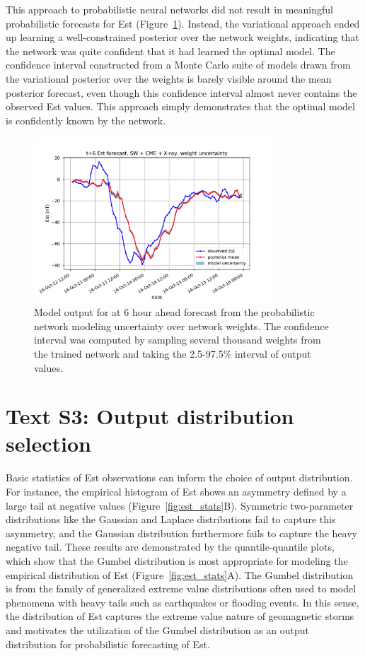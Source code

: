 \documentclass{agujournal2018}
\begin{document}
This approach to probabilistic neural networks did not result in meaningful probabilistic forecasts for Est (Figure~\ref{fig:weight_uncertainty}). Instead, the variational approach ended up learning a well-constrained posterior over the network weights, indicating that the network was quite confident that it had learned the optimal model. The confidence interval constructed from a Monte Carlo suite of models drawn from the variational posterior over the weights is barely visible around the mean posterior forecast, even though this confidence interval almost never contains the observed Est values. This approach simply demonstrates that the optimal model is confidently known by the network.

\begin{figure}[htbp]
  \centering
  \includegraphics[width=0.8\textwidth]{figures/supplement/Est_forecast_SWCMEXray_weightuncertainty_t+6_storm1.pdf} 
  \caption{Model output for at 6 hour ahead forecast from the probabilistic network modeling uncertainty over network weights. The confidence interval was computed by sampling several thousand weights from the trained network and taking the 2.5-97.5\% interval of output values. }
  \label{fig:weight_uncertainty}
\end{figure}


\section*{Text S3: Output distribution selection}

Basic statistics of Est observations can inform the choice of output distribution. For instance, the  empirical histogram of Est shows an asymmetry defined by a large tail at negative values (Figure~\ref{fig:est_stats}B). Symmetric two-parameter distributions like the Gaussian and Laplace distributions fail to capture this asymmetry, and the Gaussian distribution furthermore fails to capture the heavy negative tail. These results are demonstrated by the quantile-quantile plots, which show that the Gumbel distribution is most appropriate for modeling the empirical distribution of Est (Figure~\ref{fig:est_stats}A). The Gumbel distribution is from the family of generalized extreme value distributions often used to model phenomena with heavy tails such as earthquakes or flooding events. In this sense, the distribution of Est captures the extreme value nature of geomagnetic storms and motivates the utilization of the Gumbel distribution as an output distribution for probabilistic forecasting of Est.
\end{document}
